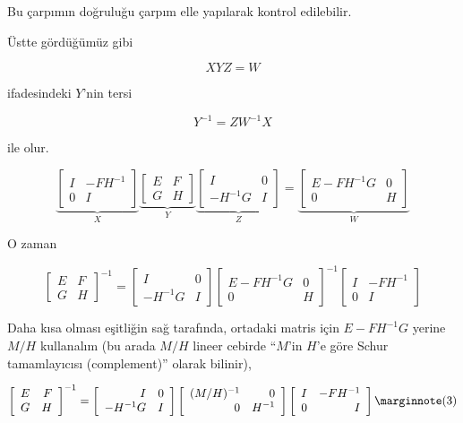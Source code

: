 \documentclass[12pt,fleqn]{article}\usepackage{../../common}
\begin{document}
Bu çarpımın doğruluğu çarpım elle yapılarak kontrol edilebilir.

Üstte gördüğümüz gibi 

$$ XYZ = W $$

ifadesindeki $Y$'nin tersi 

$$ Y^{-1} = ZW^{-1}X $$

ile olur. 

$$ 
\underbrace{
\left[\begin{array}{rr}
I & -FH^{-1} \\
0 & I
\end{array}\right] 
}_{X}
\underbrace{
\left[\begin{array}{rr}
E & F \\
G & H
\end{array}\right] 
}_{Y}
\underbrace{
\left[\begin{array}{rr}
I & 0 \\
-H^{-1}G & I
\end{array}\right] 
}_{Z}
= 
\underbrace{
\left[\begin{array}{rr}
E-FH^{-1}G & 0 \\
0 & H
\end{array}\right] 
}_{W}
 $$

O zaman 

$$ 
\left[\begin{array}{rr}
E & F \\
G & H
\end{array}\right]^{-1}
=
\left[\begin{array}{rr}
I & 0 \\
-H^{-1}G & I
\end{array}\right] 
\left[\begin{array}{rr}
E-FH^{-1}G & 0 \\
0 & H
\end{array}\right]^{-1}
\left[\begin{array}{rr}
I & -FH^{-1} \\
0 & I
\end{array}\right] 
 $$

Daha kısa olması eşitliğin sağ tarafında, ortadaki matris için
$E-FH^{-1}G$ yerine $M/H$ kullanalım (bu arada $M/H$ lineer cebirde ``$M$'in
$H$'e göre Schur tamamlayıcısı (complement)'' olarak bilinir),

$$ 
\left[\begin{array}{rr}
E & F \\
G & H
\end{array}\right]^{-1}
=
\left[\begin{array}{rr}
I & 0 \\
-H^{-1}G & I
\end{array}\right] 
\left[\begin{array}{rr}
(M/H)^{-1} & 0 \\
0 & H^{-1}
\end{array}\right]
\left[\begin{array}{rr}
I & -FH^{-1} \\
0 & I
\end{array}\right] 
\mlabel{3}
 $$
\end{document}
